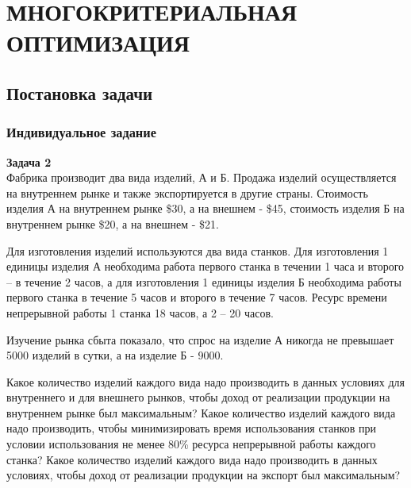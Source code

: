 


\tableofcontents
\clearpage

%
\chapter{МНОГОКРИТЕРИАЛЬНАЯ ОПТИМИЗАЦИЯ}
\section{Постановка задачи}
\subsection{Индивидуальное задание}
\textbf{Задача 2}\\
Фабрика производит два вида изделий, А и Б. Продажа изделий осуществляется на внутреннем рынке и также экспортируется в другие страны. Стоимость изделия А на внутреннем рынке \$30, а на внешнем - \$45, стоимость изделия Б на внутреннем рынке \$20, а на внешнем - \$21.

Для изготовления изделий используются два вида станков. Для изготовления 1 единицы изделия А необходима работа первого станка в течении 1 часа и второго – в течение 2 часов, а для изготовления 1 единицы изделия Б необходима работы первого станка в течение 5 часов и второго в течение 7 часов. Ресурс времени непрерывной работы 1 станка 18 часов, а 2 – 20 часов. 

Изучение рынка сбыта показало, что спрос на изделие А никогда не превышает 5000 изделий в сутки, а на изделие Б - 9000. 

Какое количество изделий каждого вида надо производить в  данных условиях для внутреннего и для внешнего рынков, чтобы доход от реализации продукции на внутреннем рынке был максимальным?  Какое количество изделий каждого вида надо производить, чтобы минимизировать время использования станков при  условии использования не менее 80\% ресурса непрерывной работы каждого станка? Какое количество изделий каждого вида надо производить в  данных условиях, чтобы доход от реализации продукции на экспорт был максимальным?

